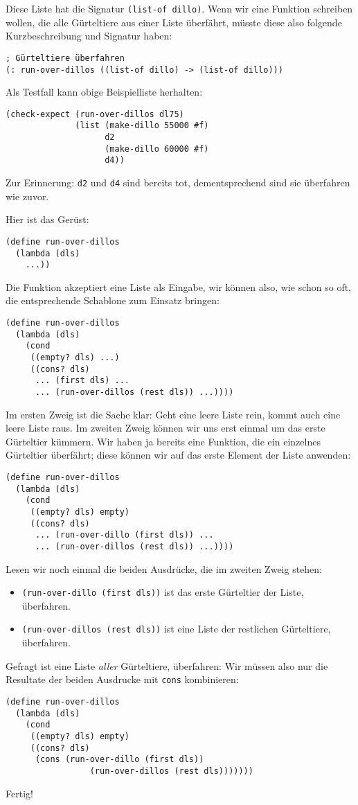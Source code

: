 Diese Liste hat die Signatur \texttt{(list-of dillo)}.  Wenn wir eine
Funktion schreiben wollen, die alle Gürteltiere aus einer Liste
überfährt, müsste diese also folgende Kurzbeschreibung und Signatur
haben:
%
\begin{verbatim}
; Gürteltiere überfahren
(: run-over-dillos ((list-of dillo) -> (list-of dillo)))
\end{verbatim}
%
Als Testfall kann obige Beispielliste herhalten:
%
\begin{verbatim}
(check-expect (run-over-dillos dl75)
              (list (make-dillo 55000 #f)
                    d2
                    (make-dillo 60000 #f)
                    d4))
\end{verbatim}
%
Zur Erinnerung: \texttt{d2} und \texttt{d4} sind bereits tot,
dementsprechend sind sie überfahren wie zuvor.

Hier ist das Gerüst:
%
\begin{verbatim}
(define run-over-dillos
  (lambda (dls)
    ...))
\end{verbatim}
%
Die Funktion akzeptiert eine Liste als Eingabe, wir können also, wie
schon so oft, die entsprechende Schablone zum Einsatz bringen:
%
\begin{verbatim}
(define run-over-dillos
  (lambda (dls)
    (cond
     ((empty? dls) ...)
     ((cons? dls)
      ... (first dls) ...
      ... (run-over-dillos (rest dls)) ...))))
\end{verbatim}
%
Im ersten Zweig ist die Sache klar: Geht eine leere Liste rein, kommt
auch eine leere Liste raus.  Im zweiten Zweig können wir uns erst
einmal um das erste Gürteltier kümmern.  Wir haben ja bereits eine
Funktion, die ein einzelnes Gürteltier überfährt; diese können wir auf
das erste Element der Liste anwenden:
%
\begin{verbatim}
(define run-over-dillos
  (lambda (dls)
    (cond
     ((empty? dls) empty)
     ((cons? dls)
      ... (run-over-dillo (first dls)) ...
      ... (run-over-dillos (rest dls)) ...))))
\end{verbatim}
%
Lesen wir noch einmal die beiden Ausdrücke, die im zweiten Zweig
stehen:
%
\begin{itemize}
\item \texttt{(run-over-dillo (first dls))} ist das erste Gürteltier
  der Liste, überfahren.
\item \texttt{(run-over-dillos (rest dls))} ist eine Liste der
  restlichen Gürteltiere, überfahren.
\end{itemize}
%
Gefragt ist eine Liste \emph{aller} Gürteltiere, überfahren:
Wir müssen also nur die Resultate der beiden Ausdrucke mit
\texttt{cons} kombinieren:
%
\begin{verbatim}
(define run-over-dillos
  (lambda (dls)
    (cond
     ((empty? dls) empty)
     ((cons? dls)
      (cons (run-over-dillo (first dls))
                 (run-over-dillos (rest dls)))))))
\end{verbatim}
%
Fertig!

